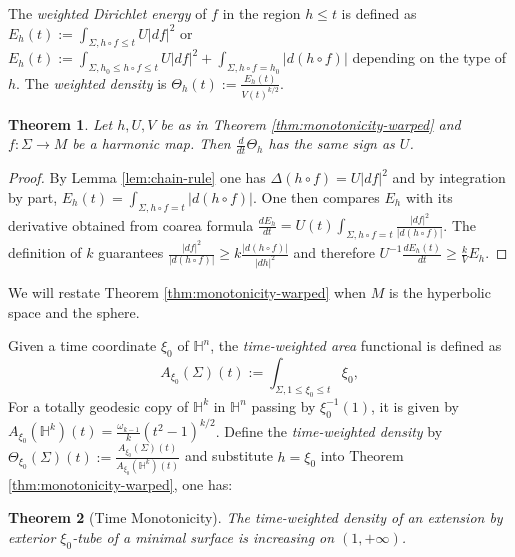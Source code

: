 \documentclass[11pt]{article}
\newtheorem{theorem}{Theorem}
\begin{document}
The \emph{weighted Dirichlet energy} of \(f\)
in the region \(h\leq t\) is defined as \(E_h(t):=\int_{\Sigma, h\circ f\leq t} U |df|^2\) or \(E_h(t):=
\int_{\Sigma, h_0\leq h\circ f\leq t} U|df|^2 + \int_{\Sigma,h\circ f = h_0}|d(h\circ f)|\)
depending on the type of \(h\). The \emph{weighted density} is \(\Theta_h(t):= \frac{E_h(t)}{V(t)^{k/2}}\).

\begin{theorem}
\label{thm:monotonicity-map}
Let \(h, U, V\) be as in Theorem \ref{thm:monotonicity-warped} and
\(f:\Sigma \longrightarrow M\) be a harmonic map. Then \(\frac{d}{dt}\Theta_h\) has the same sign as \(U\). 
\end{theorem}
\begin{proof}
By Lemma \ref{lem:chain-rule} one has \(\Delta (h\circ f) = U |df|^2\) and by
integration by part, \(E_h(t) = \int_{\Sigma, h\circ f = t} |d(h\circ f)|\). One then
compares \(E_h\) with its derivative obtained from coarea formula \(\frac{dE_h}{dt} = U(t) \int_{\Sigma, h\circ f = t}
\frac{|df|^2}{|d(h\circ f)|}\).
The definition of 
\(k\) guarantees \(\frac{|df|^2}{|d(h\circ f)|} \geq k \frac{|d(h\circ f)|}{|dh|^2}\) and therefore \(U^{-1}\frac{dE_h(t)}{dt} \geq \frac{k}{V}E_h\). 
\end{proof}


We will restate Theorem \ref{thm:monotonicity-warped} when \(M\) is the hyperbolic space
and the sphere. 

Given a time coordinate \(\xi_0\) of \(\mathbb{H}^n\),
the \emph{time-weighted area} functional is defined as
\[
 A_{\xi_0}(\Sigma)(t):= \int_{\Sigma,1\leq \xi_0\leq t}\xi_0,
\]
For a totally geodesic copy of \(\mathbb{H}^k\) in \(\mathbb{H}^n\) passing by \(\xi_0^{-1}(1)\), it is given by
\(A_{\xi_0}(\mathbb{H}^k)(t)={\frac{\omega_{k-1}}{k}(t^2-1)^{k/2}}\).
Define the \emph{time-weighted density} by \(\Theta_{\xi_0}(\Sigma)(t):=\frac{A_{\xi_0}(\Sigma)(t)}{A_{\xi_0}(\mathbb{H}^k)(t)}\) and substitute \(h=\xi_0\) into Theorem
\ref{thm:monotonicity-warped}, one has:
\begin{theorem}[Time Monotonicity]
\label{thm:monotonicity-H-time}
The time-weighted density of an extension by exterior
\(\xi_0\)-tube of a minimal
surface is increasing on \((1,+\infty)\).
\end{theorem}
\end{document}
